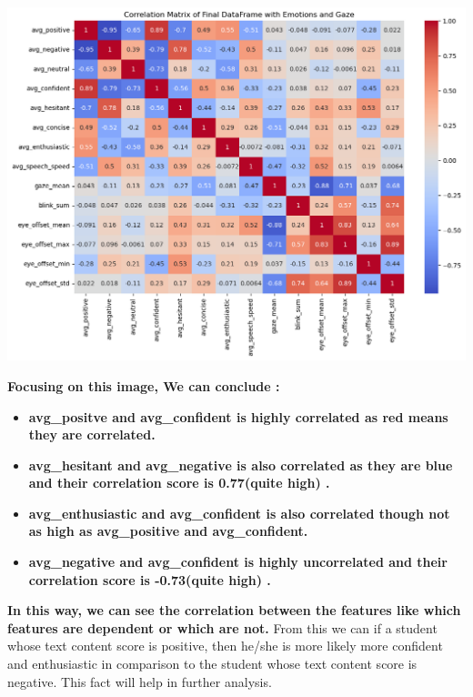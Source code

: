\documentclass{article}
\begin{document}
\begin{center}
    \includegraphics[width=1\columnwidth]{images/corr_matrix_of_final_data.png}
    \caption{}
    \label{fig:enter-label}
\end{center}


\begin{tcolorbox}[colback=cyan!5!white,colframe=cyan!75!black,title= Insights from the correlation matrix]
\textbf{Focusing on this image, We can conclude :}
\begin{itemize}
    \item \textbf{avg\_positve and avg\_confident is highly correlated as red means they are correlated.}
    \item \textbf{avg\_hesitant and avg\_negative is also correlated as they are blue and their correlation score is 0.77(quite high) .}
    \item \textbf{avg\_enthusiastic and avg\_confident is also correlated though not as high as avg\_positive and avg\_confident.}
    \item \textbf{avg\_negative and avg\_confident is highly uncorrelated and their correlation score is -0.73(quite high) .}
\end{itemize}

\textbf{In this way, we can see the correlation between the features like which features are dependent or which are not.}
 From this we can if a student whose text content score is positive, then he/she is more likely more confident and enthusiastic
 in comparison to the student whose text content score is negative. This fact will help in further analysis.\\ 
    \vspace{0.2in}

\end{tcolorbox}
\end{document}

